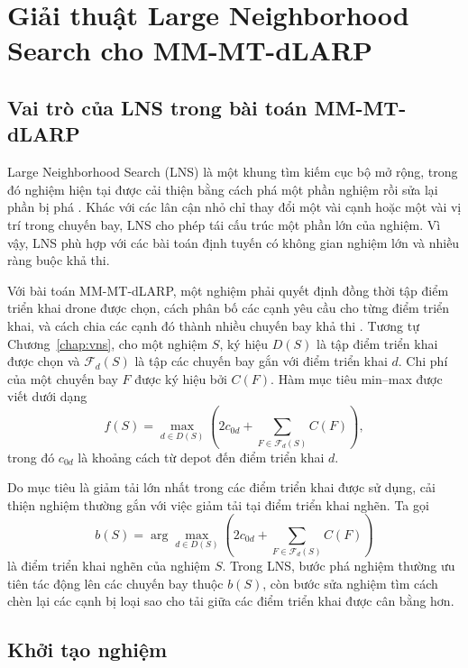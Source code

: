 \chapter{Giải thuật Large Neighborhood Search cho MM-MT-dLARP}
\label{chap:lns}

\section{Vai trò của LNS trong bài toán MM-MT-dLARP}
\label{sec:lns-role}

Large Neighborhood Search (LNS) là một khung tìm kiếm cục bộ mở rộng, trong đó nghiệm hiện tại được cải thiện bằng cách phá một phần nghiệm rồi sửa lại phần bị phá \cite{shaw1998lns,ropke2006alns,pisinger2007vrp}. Khác với các lân cận nhỏ chỉ thay đổi một vài cạnh hoặc một vài vị trí trong chuyến bay, LNS cho phép tái cấu trúc một phần lớn của nghiệm. Vì vậy, LNS phù hợp với các bài toán định tuyến có không gian nghiệm lớn và nhiều ràng buộc khả thi.

Với bài toán MM-MT-dLARP, một nghiệm phải quyết định đồng thời tập điểm triển khai drone được chọn, cách phân bố các cạnh yêu cầu cho từng điểm triển khai, và cách chia các cạnh đó thành nhiều chuyến bay khả thi \cite{corberan2025mmdlarp}. Tương tự Chương~\ref{chap:vns}, cho một nghiệm $S$, ký hiệu $D(S)$ là tập điểm triển khai được chọn và $\mathcal{F}_d(S)$ là tập các chuyến bay gắn với điểm triển khai $d$. Chi phí của một chuyến bay $F$ được ký hiệu bởi $C(F)$. Hàm mục tiêu min--max được viết dưới dạng
\begin{equation}
f(S) =
\max_{d \in D(S)}
\left(
2c_{0d}
+
\sum_{F \in \mathcal{F}_d(S)} C(F)
\right),
\label{eq:lns-objective}
\end{equation}
trong đó $c_{0d}$ là khoảng cách từ depot đến điểm triển khai $d$.

Do mục tiêu là giảm tải lớn nhất trong các điểm triển khai được sử dụng, cải thiện nghiệm thường gắn với việc giảm tải tại điểm triển khai nghẽn. Ta gọi
\begin{equation}
b(S) =
\arg\max_{d \in D(S)}
\left(
2c_{0d}
+
\sum_{F \in \mathcal{F}_d(S)} C(F)
\right)
\label{eq:lns-bottleneck}
\end{equation}
là điểm triển khai nghẽn của nghiệm $S$. Trong LNS, bước phá nghiệm thường ưu tiên tác động lên các chuyến bay thuộc $b(S)$, còn bước sửa nghiệm tìm cách chèn lại các cạnh bị loại sao cho tải giữa các điểm triển khai được cân bằng hơn.

\section{Khởi tạo nghiệm}
\label{sec:lns-initialization}

